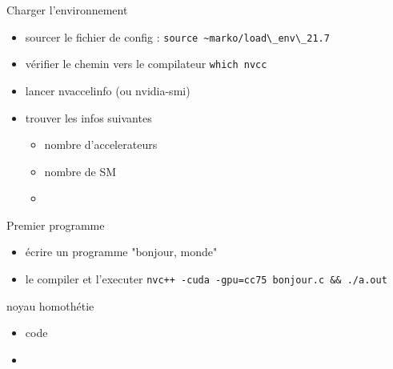 \documentclass[11pt,mathserif]{beamer}
\begin{document}
\begin{frame}{Charger l'environnement}
\begin{itemize}
  \item sourcer le fichier de config : \lstinline$source ~marko/load\_env\_21.7$
  \item vérifier le chemin vers le compilateur \lstinline$which nvcc$

  \item lancer nvaccelinfo (ou nvidia-smi)

  \item trouver les infos suivantes
  \begin{itemize}
    \item nombre d'accelerateurs
    \item nombre de SM
    \item
  \end{itemize}
\end{itemize}
\end{frame}
\begin{frame}{Premier programme}
\begin{itemize}
  \item écrire un programme "bonjour, monde"

  \item le compiler et l'executer \lstinline$nvc++ -cuda -gpu=cc75 bonjour.c && ./a.out $

\end{itemize}
\end{frame}
\begin{frame}{noyau homothétie}
\begin{itemize}
  \item code

  \item 
\end{itemize}
\end{frame}
\end{document}
